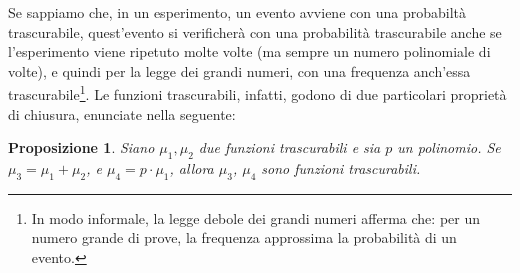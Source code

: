 \documentclass[a4paper,openright,twoside,12pt]{report}
\newtheorem{proposizione}{Proposizione}[chapter]
\begin{document}
Se sappiamo che, in un esperimento, un evento avviene con una probabilt\`a trascurabile,
quest'evento si verificher\`a con una probabilit\`a trascurabile anche se l'esperimento viene ripetuto molte volte (ma sempre un numero polinomiale di volte), e quindi per la legge dei grandi numeri, 
con una frequenza anch'essa trascurabile\footnote{In modo informale, la legge debole dei grandi numeri afferma che: per un numero grande di prove, 
la frequenza approssima la probabilit\`a di un evento.}. 
Le funzioni trascurabili, infatti, godono di due particolari propriet\`a di chiusura, enunciate nella seguente:
\begin{proposizione}
Siano $\mu_1, \mu_2$ due funzioni trascurabili e sia $p$ un polinomio. Se $\mu_3 = \mu_1 + \mu_2$, e $\mu_4= p\cdot \mu_1$, allora $\mu_3$, $\mu_4$ sono funzioni trascurabili.  
\end{proposizione} 
\end{document}
